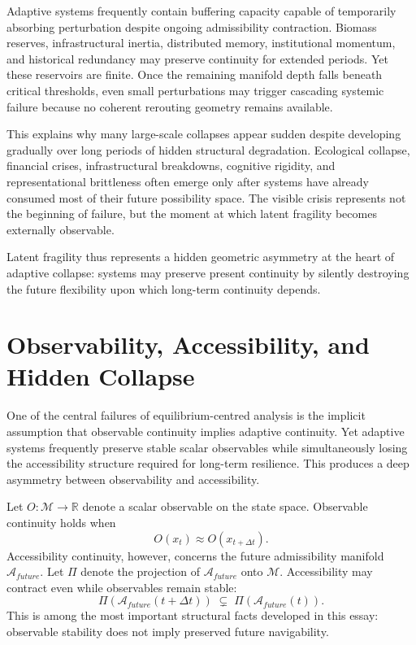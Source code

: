 \documentclass[11pt,a4paper]{article}
\newcommand{\Aspace}{\mathcal{A}}
\newcommand{\Mspace}{\mathcal{M}}
\begin{document}
Adaptive systems frequently contain buffering capacity capable of temporarily absorbing perturbation despite ongoing admissibility contraction. Biomass reserves, infrastructural inertia, distributed memory, institutional momentum, and historical redundancy may preserve continuity for extended periods. Yet these reservoirs are finite. Once the remaining manifold depth falls beneath critical thresholds, even small perturbations may trigger cascading systemic failure because no coherent rerouting geometry remains available.

This explains why many large-scale collapses appear sudden despite developing gradually over long periods of hidden structural degradation. Ecological collapse, financial crises, infrastructural breakdowns, cognitive rigidity, and representational brittleness often emerge only after systems have already consumed most of their future possibility space. The visible crisis represents not the beginning of failure, but the moment at which latent fragility becomes externally observable.

Latent fragility thus represents a hidden geometric asymmetry at the heart of adaptive collapse: systems may preserve present continuity by silently destroying the future flexibility upon which long-term continuity depends.


\newpage

\section{Observability, Accessibility, and Hidden Collapse}

One of the central failures of equilibrium-centred analysis is the implicit assumption that observable continuity implies adaptive continuity. Yet adaptive systems frequently preserve stable scalar observables while simultaneously losing the accessibility structure required for long-term resilience. This produces a deep asymmetry between observability and accessibility.

Let $O:\Mspace \rightarrow \mathbb{R}$ denote a scalar observable on the state space. Observable continuity holds when
\[
O(x_t) \approx O(x_{t+\Delta t}).
\]
Accessibility continuity, however, concerns the future admissibility manifold $\Aspace_{future}$. Let $\Pi$ denote the projection of $\Aspace_{future}$ onto $\Mspace$. Accessibility may contract even while observables remain stable:
\[
\Pi\!\left(\Aspace_{future}(t+\Delta t)\right)
\;\subsetneq\;
\Pi\!\left(\Aspace_{future}(t)\right).
\]
This is among the most important structural facts developed in this essay: observable stability does not imply preserved future navigability.
\end{document}
